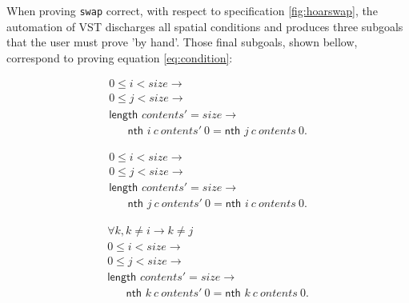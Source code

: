 \documentclass[onecolumn, preprint]{sigplanconf}
\newcommand{\nth}[3]{\textsf{nth } #1\ #2\ #3}
\begin{document}

When proving \texttt{swap} correct, with respect to specification \ref{fig:hoarswap}, the automation of VST discharges all spatial conditions and produces three subgoals that the user must prove 'by hand'. Those final subgoals, shown bellow, correspond to proving equation \ref{eq:condition}:

\begin{equation}
\label{eq:sub1}
\begin{aligned}
&0 \leq i < size \rightarrow &\\
&0 \leq j < size \rightarrow &\\
&\textsf{length } contents' = size \rightarrow &\\
& \hspace{20pt} \nth i contents' \  0 = \nth j contents \ 0.
\end{aligned}
\end{equation}

\begin{equation}
\label{eq:sub2}
\begin{aligned}
&0 \leq i < size \rightarrow &\\
&0 \leq j < size \rightarrow &\\
&\textsf{length } contents' = size \rightarrow &\\
& \hspace{20pt} \nth j contents' \  0 = \nth i contents \ 0.
\end{aligned}
\end{equation}

\begin{equation}
\label{eq:sub3}
\begin{aligned}
&\forall k, k\not = i \rightarrow k\not =j & \\
&0 \leq i < size \rightarrow &\\
&0 \leq j < size \rightarrow &\\
&\textsf{length } contents' = size \rightarrow &\\
& \hspace{20pt} \nth k contents' \  0 = \nth k contents \ 0.
\end{aligned}
\end{equation}
\end{document}
